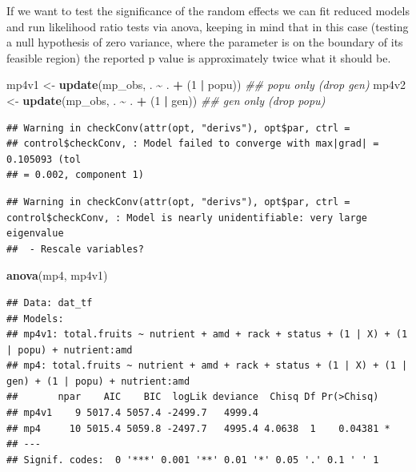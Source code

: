 \documentclass[
  12pt,
]{book}
\newenvironment{Shaded}{\begin{snugshade}}{\end{snugshade}}
\newcommand{\CommentTok}[1]{\textcolor[rgb]{0.56,0.35,0.01}{\textit{#1}}}
\newcommand{\DecValTok}[1]{\textcolor[rgb]{0.00,0.00,0.81}{#1}}
\newcommand{\KeywordTok}[1]{\textcolor[rgb]{0.13,0.29,0.53}{\textbf{#1}}}
\newcommand{\NormalTok}[1]{#1}
\newcommand{\OperatorTok}[1]{\textcolor[rgb]{0.81,0.36,0.00}{\textbf{#1}}}
\newcommand{\StringTok}[1]{\textcolor[rgb]{0.31,0.60,0.02}{#1}}
\begin{document}
If we want to test the significance of the random effects we can fit reduced models and run likelihood ratio tests via anova, keeping in mind that in this case (testing a null hypothesis of zero variance, where the parameter is on the boundary of its feasible region) the reported p value is approximately twice what it should be.

\begin{Shaded}
\begin{Highlighting}[]
\NormalTok{mp4v1 \textless{}{-}}\StringTok{ }\KeywordTok{update}\NormalTok{(mp\_obs, . }\OperatorTok{\textasciitilde{}}\StringTok{ }\NormalTok{. }\OperatorTok{+}\StringTok{ }\NormalTok{(}\DecValTok{1} \OperatorTok{|}\StringTok{ }\NormalTok{popu)) }\CommentTok{\#\# popu only (drop gen)}
\NormalTok{mp4v2 \textless{}{-}}\StringTok{ }\KeywordTok{update}\NormalTok{(mp\_obs, . }\OperatorTok{\textasciitilde{}}\StringTok{ }\NormalTok{. }\OperatorTok{+}\StringTok{ }\NormalTok{(}\DecValTok{1} \OperatorTok{|}\StringTok{ }\NormalTok{gen)) }\CommentTok{\#\# gen only (drop popu)}
\end{Highlighting}
\end{Shaded}

\begin{verbatim}
## Warning in checkConv(attr(opt, "derivs"), opt$par, ctrl =
## control$checkConv, : Model failed to converge with max|grad| = 0.105093 (tol
## = 0.002, component 1)
\end{verbatim}

\begin{verbatim}
## Warning in checkConv(attr(opt, "derivs"), opt$par, ctrl = control$checkConv, : Model is nearly unidentifiable: very large eigenvalue
##  - Rescale variables?
\end{verbatim}

\begin{Shaded}
\begin{Highlighting}[]
\KeywordTok{anova}\NormalTok{(mp4, mp4v1)}
\end{Highlighting}
\end{Shaded}

\begin{verbatim}
## Data: dat_tf
## Models:
## mp4v1: total.fruits ~ nutrient + amd + rack + status + (1 | X) + (1 | popu) + nutrient:amd
## mp4: total.fruits ~ nutrient + amd + rack + status + (1 | X) + (1 | gen) + (1 | popu) + nutrient:amd
##       npar    AIC    BIC  logLik deviance  Chisq Df Pr(>Chisq)  
## mp4v1    9 5017.4 5057.4 -2499.7   4999.4                       
## mp4     10 5015.4 5059.8 -2497.7   4995.4 4.0638  1    0.04381 *
## ---
## Signif. codes:  0 '***' 0.001 '**' 0.01 '*' 0.05 '.' 0.1 ' ' 1
\end{verbatim}
\end{document}
